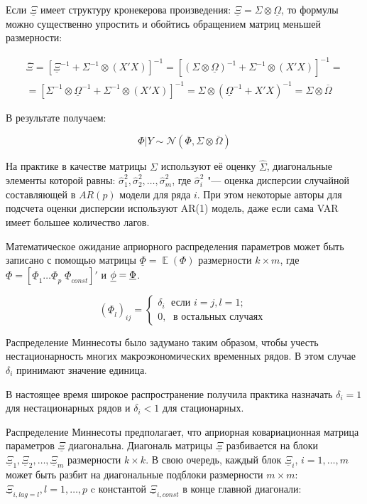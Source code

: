\documentclass[11pt]{article} %
\DeclareMathOperator{\E}{\mathbb{E}}
\newcommand{\cN}{\mathcal{N}}
\newcommand{\prior}{\underline}
\newcommand{\post}{\overline}
\let\vec\relax
\DeclareMathOperator{\vec}{vec}
\begin{document}
Если $\prior\Xi$ имеет структуру кронекерова произведения: $\prior\Xi = \Sigma \otimes \prior{\Omega}$, то формулы можно существенно упростить и обойтись обращением матриц меньшей размерности:

\begin{multline}
\post \Xi=[\prior \Xi^{-1}+\Sigma^{-1}\otimes(X'X)]^{-1}=[(\Sigma \otimes \prior\Omega)^{-1}+\Sigma^{-1}\otimes(X'X)]^{-1}=\\
=[\Sigma^{-1}\otimes  \prior\Omega^{-1} +\Sigma^{-1}\otimes(X'X)]^{-1}=\Sigma \otimes (\prior\Omega^{-1}+ X'X)^{-1} = \Sigma \otimes \post \Omega
\end{multline}

В результате получаем:

\[
\Phi | Y \sim \cN (\post\Phi, \Sigma \otimes \post\Omega)
\]

На практике в качестве матрицы $\Sigma$ используют её оценку $\hat\Sigma$, диагональные элементы которой равны: $\hat\sigma_{1}^2, \hat\sigma_{2}^2,\ldots,\hat\sigma_{m}^2 $, где  $\hat\sigma_{i}^2$ "--- оценка дисперсии случайной составляющей в $AR(p)$ модели для ряда $i$. При этом некоторые авторы для подсчета оценки дисперсии используют AR(1) модель, даже если сама VAR имеет большее количество лагов.

Математическое ожидание априорного распределения параметров может быть записано с помощью матрицы $\prior \Phi = \E (\Phi)$ размерности $k\times m$, где $\prior\Phi=[\prior\Phi_1 \ldots \prior\Phi_p \; \prior\Phi_{const}]'$ и $\prior \phi = \vec{ \prior \Phi}$.


\begin{equation}
(\prior\Phi_l)_{ij}=
\begin{cases}
\delta_i\; \mbox{ если } i=j, l=1;\\
0,\;\text{ в остальных случаях }
\end{cases}\label{minnesota_exp}
\end{equation}


Распределение Миннесоты было задумано таким образом, чтобы учесть нестационарность многих макроэкономических временных рядов. В этом случае $\delta_{i}$ принимают значение единица.

В настоящее время широкое распространение получила практика назначать $\delta_{i}=1$ для нестационарных рядов и $\delta_{i}<1$ для стационарных.

Распределение Миннесоты предполагает, что априорная ковариационная матрица параметров $\prior \Xi$ диагональна. Диагональ матрицы $\prior \Xi$ разбивается на блоки  $\prior \Xi_1,\prior \Xi_2, \ldots, \prior \Xi_m$ размерности $k\times k$. В свою очередь, каждый блок $\prior \Xi_i$, $i=1,\ldots,m$ может быть разбит на диагональные подблоки размерности $m\times m$: $\prior \Xi_{i,lag=l}, l=1,\ldots, p$ c константой $\prior \Xi_{i,const}$  в конце главной диагонали:
\end{document}
